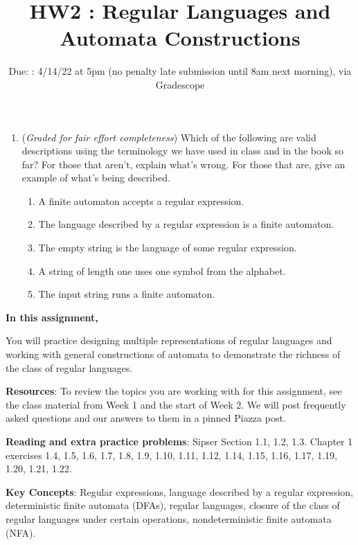 \documentclass[12pt, oneside]{article}
\begin{document}
\begin{enumerate}
\item ({\it Graded for fair effort completeness})
Which of the following are valid descriptions using the terminology we have used in 
class and in the book so far? For those that aren't, explain what's wrong. For those that are, 
give an example of what's being described.
\begin{enumerate}
\item A finite automaton accepts a regular expression.
\item The language described by a regular expression is a finite automaton.
\item The empty string is the language of some regular expression.
\item A string of length one uses one symbol from the alphabet.
\item The input string runs a finite automaton.
\end{enumerate}


\end{enumerate}
\newpage

\title{HW2 : Regular Languages and Automata Constructions}
\date{Due: : 4/14/22 at 5pm (no penalty late submission until 8am next morning), via Gradescope}


\maketitle
\thispagestyle{fancy}


{\bf In this assignment,}

You will practice designing multiple representations of regular languages
and working with general constructions of automata to demonstrate the 
richness of the class of regular languages.

{\bf Resources}: To review the topics you are working with 
for this assignment, see the class material from  Week 1 and the start of Week 2.
We will post frequently asked questions and our answers to them in a 
pinned Piazza post.

{\bf Reading and extra practice problems}: Sipser Section 1.1, 1.2, 1.3.
Chapter 1 exercises 1.4, 1.5, 1.6, 1.7, 1.8, 1.9, 1.10, 1.11, 1.12, 1.14, 1.15, 1.16, 1.17, 1.19, 1.20, 1.21, 1.22.

{\bf Key Concepts}: Regular expressions, language described by a regular expression, deterministic finite automata (DFAs), 
regular languages, closure of the class of regular languages under certain operations, 
nondeterministic finite automata (NFA).
\end{document}
